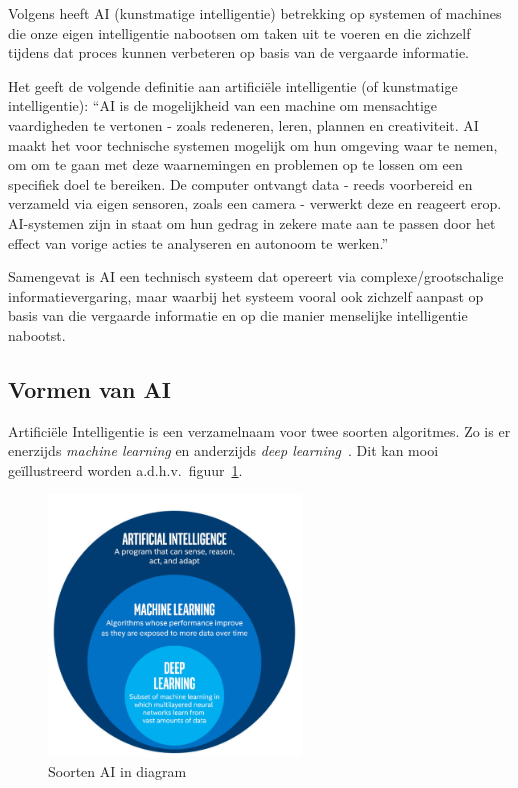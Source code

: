 {Volgens \textcite{Oracle2014} heeft AI (kunstmatige intelligentie) betrekking op systemen of machines die onze eigen intelligentie nabootsen om taken uit te voeren en die zichzelf tijdens dat proces kunnen verbeteren op basis van de vergaarde informatie.

Het \textcite{EuropeesParlement2020} geeft de volgende definitie aan artificiële intelligentie (of kunstmatige intelligentie): ``AI is de mogelijkheid van een machine om mensachtige vaardigheden te vertonen - zoals redeneren, leren, plannen en creativiteit.
AI maakt het voor technische systemen mogelijk om hun omgeving waar te nemen, om om te gaan met deze waarnemingen en problemen op te lossen om een specifiek doel te bereiken. De computer ontvangt data - reeds voorbereid en verzameld via eigen sensoren, zoals een camera - verwerkt deze en reageert erop.
AI-systemen zijn in staat om hun gedrag in zekere mate aan te passen door het effect van vorige acties te analyseren en autonoom te werken.''

Samengevat is AI een technisch systeem dat opereert via complexe/grootschalige informatievergaring, maar waarbij het systeem vooral ook zichzelf aanpast op basis van die vergaarde informatie en op die manier menselijke intelligentie nabootst.

\subsection{Vormen van AI}
Artificiële Intelligentie is een verzamelnaam voor twee soorten algoritmes. Zo is er enerzijds \textit{machine learning} en anderzijds \textit{deep learning}~\autocite{Kavlakoglu2020}.
Dit kan mooi geïllustreerd worden a.d.h.v.\ figuur~\ref{fig:soorten_ai_diagram}.

\begin{figure}
    \centering
    \includegraphics[width=0.6\textwidth]{./img/ai_fields}
    \caption{\label{fig:soorten_ai_diagram} Soorten AI in diagram~\autocite{Bansal2019}}
\end{figure}

}
